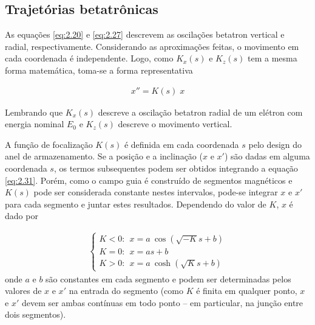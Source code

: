 \subsection{Trajetórias betatrônicas}
As equações \eqref{eq:2.20} e \eqref{eq:2.27} descrevem as oscilações betatron vertical e radial, respectivamente. Considerando as aproximações feitas, o movimento em cada coordenada é independente. Logo, como $K_x(s)$ e $K_z(s)$ tem a mesma forma matemática, toma-se a forma representativa
	
\begin{align}
	x'' = K(s) \; x \label{eq:2.31}
\end{align}
	
Lembrando que $K_x(s)$ descreve a oscilação betatron radial de um elétron com energia nominal $E_0$ e $K_z(s)$ descreve o movimento vertical.
	
A função de focalização $K(s)$ é definida em cada coordenada $s$ pelo design do anel de armazenamento. Se a posição e a inclinação ($x$ e $x'$) são dadas em alguma coordenada $s$, os termos subsequentes podem ser obtidos integrando a equação \eqref{eq:2.31}. Porém, como o campo guia é construído de segmentos magnéticos e $K(s)$ pode ser considerada constante nestes intervalos, pode-se integrar $x$ e $x'$ para cada segmento e juntar estes resultados. Dependendo do valor de $K$, $x$ é dado por

\begin{align}
	\left\{\begin{array}{l}
	K<0: \ \ x = a\ \cos(\sqrt{-K}s+b) \\
	K=0: \ \ x = as+b \\
	K>0: \ \ x = a\ \cosh(\sqrt{K}s+b)
	\end{array}\right. \label{eq:2.32}
\end{align}
onde $a$ e $b$ são constantes em cada segmento e podem ser determinadas pelos valores de $x$ e $x'$ na entrada do segmento (como $K$ é finita em qualquer ponto, $x$ e $x'$ devem ser ambas contínuas em todo ponto -- em particular, na junção entre dois segmentos).
	
